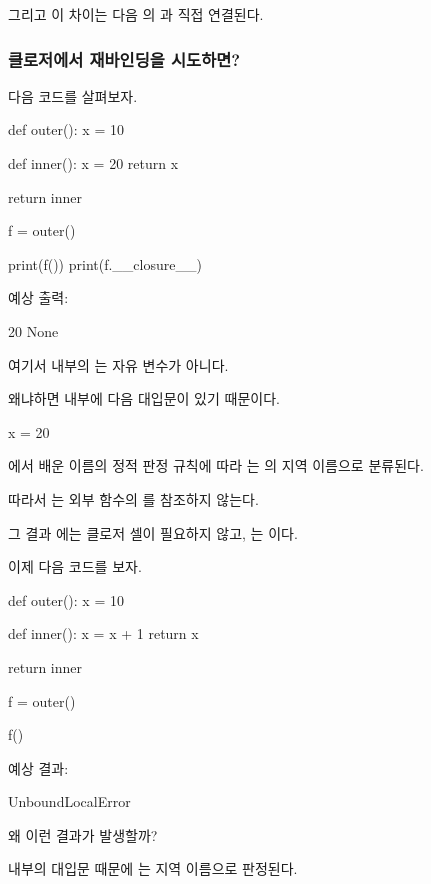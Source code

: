 그리고 이 차이는 다음 의 과 직접 연결된다.

\subsubsection{클로저에서 재바인딩을 시도하면?}

다음 코드를 살펴보자.

\begin{dhkcode}
def outer():
    x = 10

    def inner():
        x = 20
        return x

    return inner


f = outer()

print(f())
print(f.__closure__)
\end{dhkcode}

예상 출력:

\begin{dhkzsh}
20
None
\end{dhkzsh}

여기서  내부의 는 자유 변수가 아니다.

왜냐하면  내부에 다음 대입문이 있기 때문이다.

\begin{dhkcode}
x = 20
\end{dhkcode}

에서 배운 이름의 정적 판정 규칙에 따라 는 의 지역 이름으로 분류된다.

따라서 는 외부 함수의 를 참조하지 않는다.

그 결과 에는 클로저 셀이 필요하지 않고, 는 이다.

이제 다음 코드를 보자.

\begin{dhkcode}
def outer():
    x = 10

    def inner():
        x = x + 1
        return x

    return inner


f = outer()

f()
\end{dhkcode}

예상 결과:

\begin{dhkzsh}
UnboundLocalError
\end{dhkzsh}

왜 이런 결과가 발생할까?

 내부의 대입문 때문에 는 지역 이름으로 판정된다.

